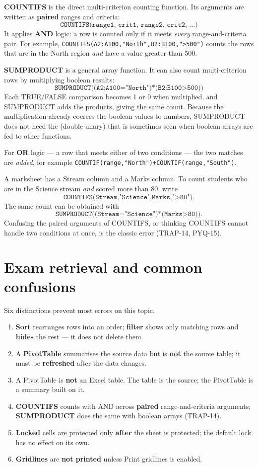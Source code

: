 \textbf{COUNTIFS} is the direct multi-criterion counting function. Its arguments
are written as \textbf{paired} ranges and criteria:
\[
\texttt{COUNTIFS(range1, crit1, range2, crit2, \ldots)}
\]
It applies \textbf{AND} logic: a row is counted only if it meets \emph{every}
range-and-criteria pair. For example,
\texttt{COUNTIFS(A2:A100,"North",B2:B100,">500")} counts the rows that are in
the North region \emph{and} have a value greater than 500.

\textbf{SUMPRODUCT} is a general array function. It can also count
multi-criterion rows by multiplying boolean results:
\[
\texttt{SUMPRODUCT((A2:A100="North")*(B2:B100>500))}
\]
Each TRUE/FALSE comparison becomes 1 or 0 when multiplied, and SUMPRODUCT adds
the products, giving the same count. Because the multiplication already coerces
the boolean values to numbers, SUMPRODUCT does not need the \key{--} (double
unary) that is sometimes seen when boolean arrays are fed to other functions.

For \textbf{OR} logic --- a row that meets either of two conditions --- the two
matches are \emph{added}, for example
\texttt{COUNTIF(range,"North")+COUNTIF(range,"South")}.

\begin{example}
A marksheet has a Stream column and a Marks column. To count students who are in
the Science stream \emph{and} scored more than 80, write
\[ \texttt{COUNTIFS(Stream,"Science",Marks,">80")}. \]
The same count can be obtained with
\[ \texttt{SUMPRODUCT((Stream="Science")*(Marks>80))}. \]
Confusing the paired arguments of COUNTIFS, or thinking COUNTIFS cannot handle
two conditions at once, is the classic error (TRAP-14, PYQ-15).
\end{example}

\section{Exam retrieval and common confusions}
Six distinctions prevent most errors on this topic.
\begin{enumerate}
  \item \textbf{Sort} rearranges rows into an order; \textbf{filter} shows only
    matching rows and \textbf{hides} the rest --- it does not delete them.
  \item A \textbf{PivotTable} summarises the source data but is \textbf{not} the
    source table; it must be \textbf{refreshed} after the data changes.
  \item A PivotTable is \textbf{not} an Excel table. The table is the source;
    the PivotTable is a summary built on it.
  \item \textbf{COUNTIFS} counts with AND across \textbf{paired}
    range-and-criteria arguments; \textbf{SUMPRODUCT} does the same with
    boolean arrays (TRAP-14).
  \item \textbf{Locked} cells are protected only \textbf{after} the sheet is
    protected; the default lock has no effect on its own.
  \item \textbf{Gridlines} are \textbf{not printed} unless Print gridlines is
    enabled.
\end{enumerate}

